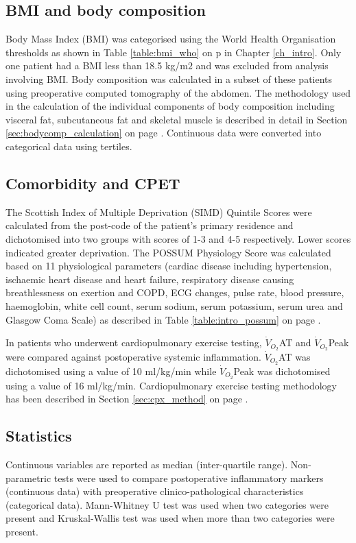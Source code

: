 \subsection{BMI and body composition}
Body Mass Index (BMI) was categorised using the World Health Organisation thresholds as shown in Table \ref{table:bmi_who} on p \pageref{table:bmi_who} in Chapter \ref{ch_intro}. 
Only one patient had a BMI less than 18.5 kg/m$2$ and was excluded from analysis involving BMI.
Body composition was calculated in a subset of these patients using preoperative computed tomography of the abdomen. 
The methodology used in the calculation of the individual components of body composition including visceral fat, subcutaneous fat and skeletal muscle is described in detail in Section \ref{sec:bodycomp_calculation} on page \pageref{sec:bodycomp_calculation}. 
Continuous data were converted into categorical data using tertiles.

\subsection{Comorbidity and CPET}
The Scottish Index of Multiple Deprivation (SIMD) Quintile Scores were calculated from the post-code of the patient's primary residence and dichotomised into two groups with scores of 1-3 and 4-5 respectively.
Lower scores indicated greater deprivation.
The POSSUM Physiology Score was calculated based on 11 physiological parameters (cardiac disease including hypertension, ischaemic heart disease and heart failure, respiratory disease causing breathlessness on exertion and COPD, ECG changes, pulse rate, blood pressure, haemoglobin, white cell count, serum sodium, serum potassium, serum urea and Glasgow Coma Scale) as described in Table \ref{table:intro_possum} on page \pageref{table:intro_possum}.

In patients who underwent cardiopulmonary exercise testing, $\dot{V}_{O_2}$AT and $\dot{V}_{O_2}$Peak were compared against postoperative systemic inflammation. 
$\dot{V}_{O_2}$AT was dichotomised using a value of 10 ml/kg/min while $\dot{V}_{O_2}$Peak was dichotomised using a value of 16 ml/kg/min. 
Cardiopulmonary exercise testing methodology has been described in Section \ref{sec:cpx_method} on page \pageref{sec:cpx_method}.

\subsection{Statistics}
Continuous variables are reported as median (inter-quartile range).
Non-parametric tests were used to compare postoperative inflammatory markers (continuous data) with preoperative clinico-pathological characteristics (categorical data). 
Mann-Whitney U test was used when two categories were present and Kruskal-Wallis test was used when more than two categories were present.

